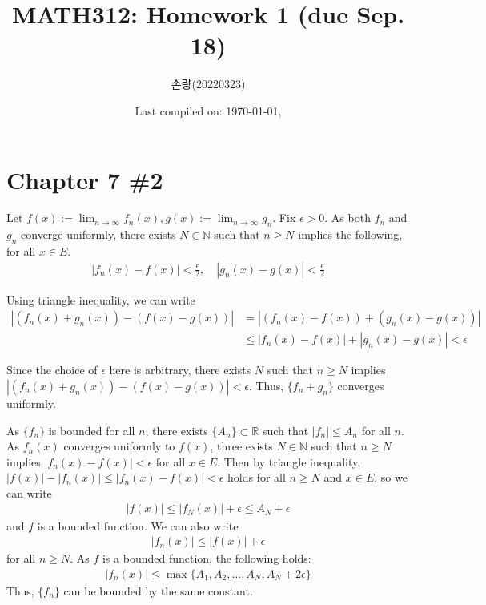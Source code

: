 \documentclass{scrartcl}
\title{MATH312: Homework 1 (due Sep. 18)}
\author{손량(20220323)}
\date{Last compiled on: \today, \currenttime}
\begin{document}
\maketitle

\section{Chapter 7 \#2}
Let \(f(x) := \lim_{n \to \infty} f_n(x), g(x) := \lim_{n \to \infty} g_n\).
Fix \(\epsilon > 0\). As both \(f_n\) and \(g_n\) converge uniformly, there
exists \(N \in \mathbb{N}\) such that \(n \geq N\) implies the following, for
all \(x \in E\).
\begin{align*}
  |f_n(x) - f(x)| < \frac{\epsilon}{2},\quad
  |g_n(x) - g(x)| < \frac{\epsilon}{2}
\end{align*}

Using triangle inequality, we can write
\begin{align*}
  |(f_n(x) + g_n(x)) - (f(x) - g(x))|
  &= |(f_n(x) - f(x)) + (g_n(x) - g(x))| \\
  &\leq |f_n(x) - f(x)| + |g_n(x) - g(x)|
  < \epsilon
\end{align*}

Since the choice of \(\epsilon\) here is arbitrary, there exists \(N\) such
that \(n \geq N\) implies \(|(f_n(x) + g_n(x)) - (f(x) - g(x))| < \epsilon\).
Thus, \(\{f_n + g_n\}\) converges uniformly.

As \(\{f_n\}\) is bounded for all \(n\), there exists \(\{A_n\} \subset
\mathbb{R}\) such that \(|f_n| \leq A_n\) for all \(n\). As \(f_n(x)\)
converges uniformly to \(f(x)\), three exists \(N \in \mathbb{N}\) such that
\(n \geq N\) implies \(|f_n(x) - f(x)| < \epsilon\) for all \(x \in E\). Then
by triangle inequality, \(|f(x)| - |f_n(x)| \leq |f_n(x) - f(x)| < \epsilon\)
holds for all \(n \geq N\) and \(x \in E\), so we can write
\begin{align*}
  |f(x)| \leq |f_N(x)| + \epsilon \leq A_N + \epsilon
\end{align*}
and \(f\) is a bounded function. We can also write
\begin{align*}
  |f_n(x)| \leq |f(x)| + \epsilon
\end{align*}
for all \(n \geq N\). As \(f\) is a bounded function, the following holds:
\begin{align*}
  |f_n(x)| \leq \max \{A_1, A_2, \dots, A_N, A_N + 2\epsilon\}
\end{align*}
Thus, \(\{f_n\}\) can be bounded by the same constant.
\end{document}
